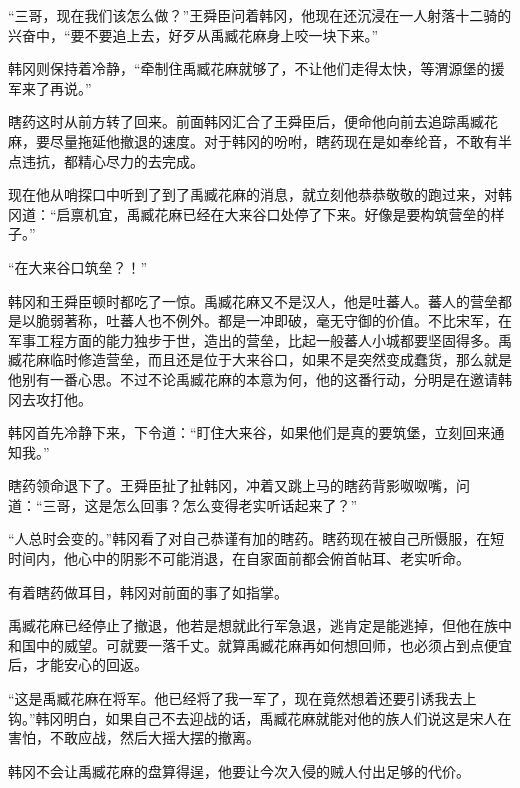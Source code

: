 “三哥，现在我们该怎么做？”王舜臣问着韩冈，他现在还沉浸在一人射落十二骑的兴奋中，“要不要追上去，好歹从禹臧花麻身上咬一块下来。”

韩冈则保持着冷静，“牵制住禹臧花麻就够了，不让他们走得太快，等渭源堡的援军来了再说。”

瞎药这时从前方转了回来。前面韩冈汇合了王舜臣后，便命他向前去追踪禹臧花麻，要尽量拖延他撤退的速度。对于韩冈的吩咐，瞎药现在是如奉纶音，不敢有半点违抗，都精心尽力的去完成。

现在他从哨探口中听到了到了禹臧花麻的消息，就立刻他恭恭敬敬的跑过来，对韩冈道：“启禀机宜，禹臧花麻已经在大来谷口处停了下来。好像是要构筑营垒的样子。”

“在大来谷口筑垒？！”

韩冈和王舜臣顿时都吃了一惊。禹臧花麻又不是汉人，他是吐蕃人。蕃人的营垒都是以脆弱著称，吐蕃人也不例外。都是一冲即破，毫无守御的价值。不比宋军，在军事工程方面的能力独步于世，造出的营垒，比起一般蕃人小城都要坚固得多。禹臧花麻临时修造营垒，而且还是位于大来谷口，如果不是突然变成蠢货，那么就是他别有一番心思。不过不论禹臧花麻的本意为何，他的这番行动，分明是在邀请韩冈去攻打他。

韩冈首先冷静下来，下令道：“盯住大来谷，如果他们是真的要筑堡，立刻回来通知我。”

瞎药领命退下了。王舜臣扯了扯韩冈，冲着又跳上马的瞎药背影呶呶嘴，问道：“三哥，这是怎么回事？怎么变得老实听话起来了？”

“人总时会变的。”韩冈看了对自己恭谨有加的瞎药。瞎药现在被自己所慑服，在短时间内，他心中的阴影不可能消退，在自家面前都会俯首帖耳、老实听命。

有着瞎药做耳目，韩冈对前面的事了如指掌。

禹臧花麻已经停止了撤退，他若是想就此行军急退，逃肯定是能逃掉，但他在族中和国中的威望。可就要一落千丈。就算禹臧花麻再如何想回师，也必须占到点便宜后，才能安心的回返。

“这是禹臧花麻在将军。他已经将了我一军了，现在竟然想着还要引诱我去上钩。”韩冈明白，如果自己不去迎战的话，禹臧花麻就能对他的族人们说这是宋人在害怕，不敢应战，然后大摇大摆的撤离。

韩冈不会让禹臧花麻的盘算得逞，他要让今次入侵的贼人付出足够的代价。

